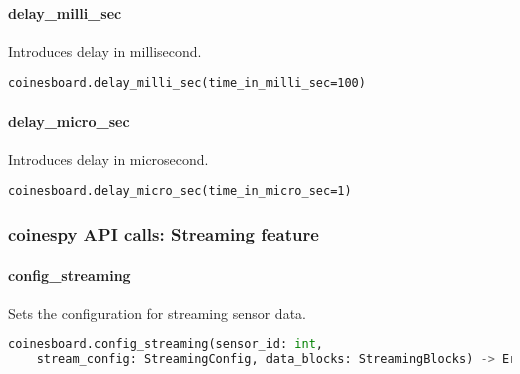 \paragraph{delay\_milli\_sec}
Introduces delay in millisecond.

\begin{lstlisting}
coinesboard.delay_milli_sec(time_in_milli_sec=100)
\end{lstlisting}

\paragraph{delay\_micro\_sec}
Introduces delay in microsecond.

\begin{lstlisting}
coinesboard.delay_micro_sec(time_in_micro_sec=1)
\end{lstlisting}

\subsubsection{coinespy API calls: Streaming feature}

\paragraph{config\_streaming}

Sets the configuration for streaming sensor data.

\begin{lstlisting}[language=python]
coinesboard.config_streaming(sensor_id: int,
	stream_config: StreamingConfig, data_blocks: StreamingBlocks) -> ErrorCodes
\end{lstlisting}

